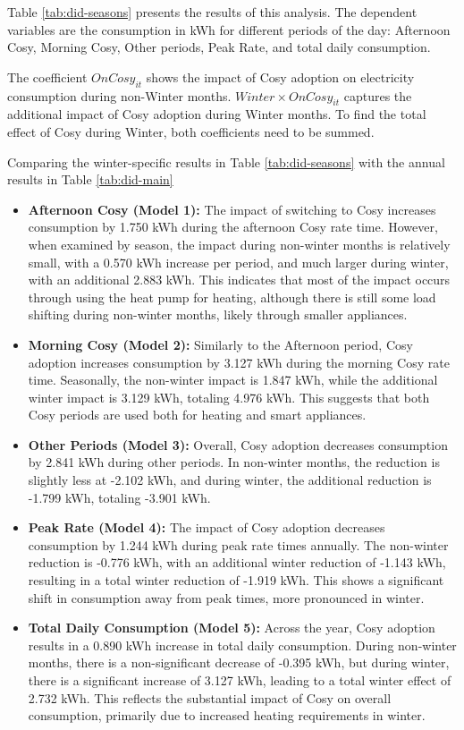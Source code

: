 \documentclass[
]{article}
\begin{document}
Table \ref{tab:did-seasons} presents the results of this analysis. The dependent variables are the consumption in kWh for different periods of the day: Afternoon Cosy, Morning Cosy, Other periods, Peak Rate, and total daily consumption.

The coefficient \(OnCosy_{it}\) shows the impact of Cosy adoption on electricity consumption during non-Winter months. \(Winter \times OnCosy_{it}\) captures the additional impact of Cosy adoption during Winter months. To find the total effect of Cosy during Winter, both coefficients need to be summed.

Comparing the winter-specific results in Table \ref{tab:did-seasons} with the annual results in Table \ref{tab:did-main}

\begin{itemize}
\item
  \textbf{Afternoon Cosy (Model 1):} The impact of switching to Cosy increases consumption by 1.750 kWh during the afternoon Cosy rate time. However, when examined by season, the impact during non-winter months is relatively small, with a 0.570 kWh increase per period, and much larger during winter, with an additional 2.883 kWh. This indicates that most of the impact occurs through using the heat pump for heating, although there is still some load shifting during non-winter months, likely through smaller appliances.
\item
  \textbf{Morning Cosy (Model 2):} Similarly to the Afternoon period, Cosy adoption increases consumption by 3.127 kWh during the morning Cosy rate time. Seasonally, the non-winter impact is 1.847 kWh, while the additional winter impact is 3.129 kWh, totaling 4.976 kWh. This suggests that both Cosy periods are used both for heating and smart appliances.
\item
  \textbf{Other Periods (Model 3):} Overall, Cosy adoption decreases consumption by 2.841 kWh during other periods. In non-winter months, the reduction is slightly less at -2.102 kWh, and during winter, the additional reduction is -1.799 kWh, totaling -3.901 kWh.
\item
  \textbf{Peak Rate (Model 4):} The impact of Cosy adoption decreases consumption by 1.244 kWh during peak rate times annually. The non-winter reduction is -0.776 kWh, with an additional winter reduction of -1.143 kWh, resulting in a total winter reduction of -1.919 kWh. This shows a significant shift in consumption away from peak times, more pronounced in winter.
\item
  \textbf{Total Daily Consumption (Model 5):} Across the year, Cosy adoption results in a 0.890 kWh increase in total daily consumption. During non-winter months, there is a non-significant decrease of -0.395 kWh, but during winter, there is a significant increase of 3.127 kWh, leading to a total winter effect of 2.732 kWh. This reflects the substantial impact of Cosy on overall consumption, primarily due to increased heating requirements in winter.
\end{itemize}
\end{document}
